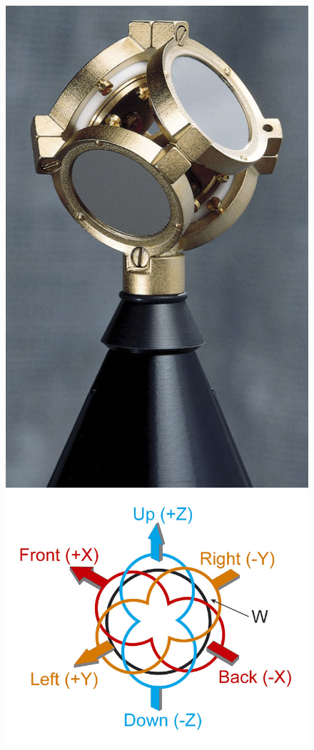 \documentclass[../../main.tex]{subfiles}
\begin{document}
			\begin{figure}[ht]
				\begin{minipage}{0.5\textwidth}
					\includegraphics[scale = 0.2]{Sections/Background/images/soudFieldMic.jpg}
				\end{minipage}
				\begin{minipage}{0.5\textwidth}
					\includegraphics[scale = 0.3]{Sections/Background/images/soundFieldPolar.jpg}

\end{minipage}
\end{figure}
\end{document}
